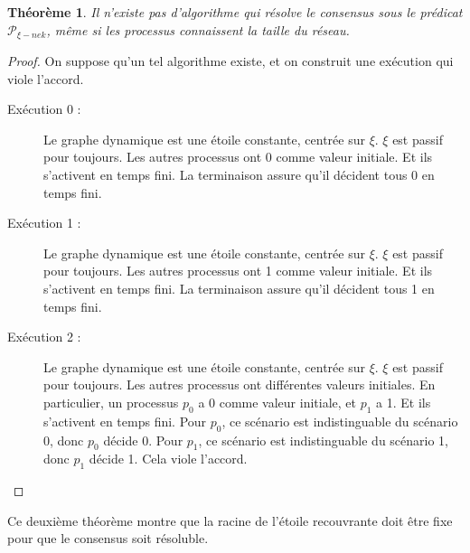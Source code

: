 \documentclass{article}
\newtheorem{theorem}{Théorème}
\begin{document}
\begin{theorem}
	Il n'existe pas d'algorithme qui résolve le consensus sous le prédicat $\mathcal{P}_{\xi-nek}$, même si les processus connaissent la taille du réseau.
\end{theorem}
\begin{proof}
	On suppose qu'un tel algorithme existe, et on construit une exécution qui viole l'accord.

	\begin{description}
		\item[Exécution 0 : ] Le graphe dynamique est une étoile constante, centrée sur $\xi$. $\xi$ est passif pour toujours. Les autres processus ont 0 comme valeur initiale.
			Et ils s'activent en temps fini. La terminaison assure qu'il décident tous 0 en temps fini.

		\item[Exécution 1 : ] Le graphe dynamique est une étoile constante, centrée sur $\xi$. $\xi$ est passif pour toujours. Les autres processus ont 1 comme valeur initiale.
			Et ils s'activent en temps fini. La terminaison assure qu'il décident tous 1 en temps fini.

		\item[Exécution 2 : ] Le graphe dynamique est une étoile constante, centrée sur $\xi$. $\xi$ est passif pour toujours. Les autres processus ont différentes valeurs initiales.
			En particulier, un processus $p_0$ a 0 comme valeur initiale, et $p_1$ a 1.
			Et ils s'activent en temps fini. Pour $p_0$, ce scénario est indistinguable du scénario 0, donc $p_0$ décide 0.
			Pour $p_1$, ce scénario est indistinguable du scénario 1, donc $p_1$ décide 1.  Cela viole l'accord.
	\end{description}
\end{proof}

Ce deuxième théorème montre que la racine de l'étoile recouvrante doit être fixe pour que le consensus soit résoluble.
\end{document}
